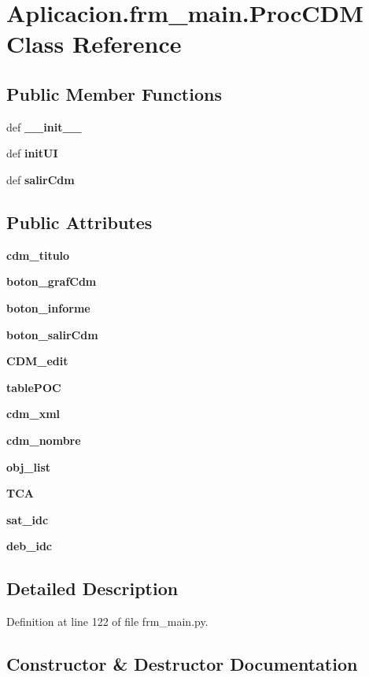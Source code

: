 \section{\-Aplicacion.\-frm\-\_\-main.\-Proc\-C\-D\-M \-Class \-Reference}
\label{class_aplicacion_1_1frm__main_1_1_proc_c_d_m}
\subsection*{\-Public \-Member \-Functions}
\begin{DoxyCompactItemize}
\item 
def {\bf \-\_\-\-\_\-init\-\_\-\-\_\-}
\item 
def {\bf init\-U\-I}
\item 
def {\bf salir\-Cdm}
\end{DoxyCompactItemize}
\subsection*{\-Public \-Attributes}
\begin{DoxyCompactItemize}
\item 
{\bf cdm\-\_\-titulo}
\item 
{\bf boton\-\_\-graf\-Cdm}
\item 
{\bf boton\-\_\-informe}
\item 
{\bf boton\-\_\-salir\-Cdm}
\item 
{\bf \-C\-D\-M\-\_\-edit}
\item 
{\bf table\-P\-O\-C}
\item 
{\bf cdm\-\_\-xml}
\item 
{\bf cdm\-\_\-nombre}
\item 
{\bf obj\-\_\-list}
\item 
{\bf \-T\-C\-A}
\item 
{\bf sat\-\_\-idc}
\item 
{\bf deb\-\_\-idc}
\end{DoxyCompactItemize}


\subsection{\-Detailed \-Description}


\-Definition at line 122 of file frm\-\_\-main.\-py.



\subsection{\-Constructor \& \-Destructor \-Documentation}
